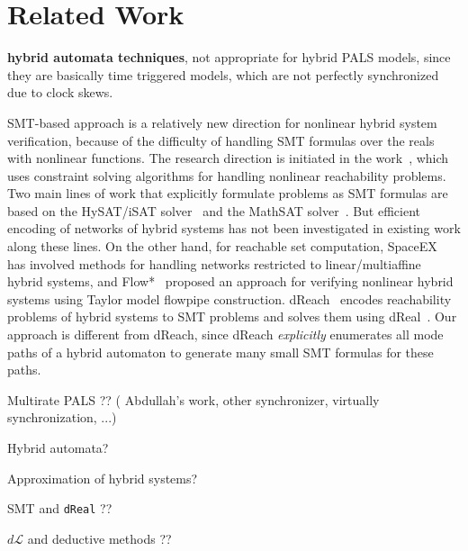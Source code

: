 

\section{Related Work}
\label{sec:related-work}



\textbf{hybrid automata techniques}, not appropriate for hybrid PALS models, 
since they are basically time triggered models, which are not perfectly synchronized due to clock skews.

SMT-based approach is a relatively new direction for nonlinear hybrid
system verification, because of the difficulty of handling SMT
formulas over the reals with nonlinear functions. The research
direction is initiated in the
work~\cite{ratschan2007safety}, which uses constraint
solving algorithms for handling nonlinear reachability problems. Two
main lines of work that explicitly formulate problems as SMT formulas
are based on the HySAT/iSAT
solver~\cite{DBLP:journals/fmsd/FranzleH07,eggers2008sat}
and the MathSAT
solver~\cite{DBLP:conf/aaai/CimattiMT12,DBLP:conf/fmcad/CimattiMT12}.
But efficient encoding of networks of hybrid systems has not been
investigated in existing work along these lines. 
%
On the other hand,
for reachable set computation, 
SpaceEX~\cite{DBLP:conf/cav/FrehseGDCRLRGDM11}
has involved methods for handling networks restricted to linear/multiaffine hybrid systems,
and 
Flow*~\cite{DBLP:conf/cav/ChenAS13} proposed an approach for verifying
nonlinear hybrid systems using Taylor model flowpipe construction. 
%
dReach~\cite{dReach}
encodes reachability problems of hybrid systems to SMT problems and
solves them using %
dReal~\cite{dReal}.
%
Our approach is different from dReach, 
since dReach \emph{explicitly} enumerates all mode paths of a hybrid automaton
to generate many small SMT formulas for these paths.



Multirate PALS ?? ( Abdullah's work, other synchronizer, virtually synchronization, ...)

Hybrid automata? 

Approximation of hybrid systems?

SMT and \texttt{dReal} ??

$d\mathcal{L}$ and deductive methods ??


